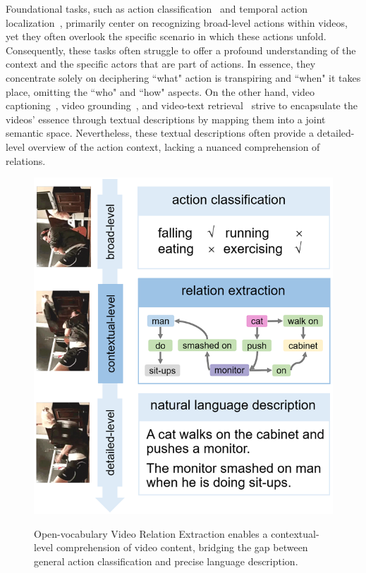 \documentclass[letterpaper]{article}
\begin{document}
Foundational tasks, such as action classification~\cite{kong2022human} and temporal action localization~\cite{9062498}, primarily center on recognizing broad-level actions within videos, yet they often overlook the specific scenario in which these actions unfold. Consequently, these tasks often struggle to offer a profound understanding of the context and the specific actors that are part of actions. In essence, they concentrate solely on deciphering ``what" action is transpiring and ``when" it takes place, omitting the ``who" and ``how" aspects.
On the other hand, video captioning~\cite{chen2019deep}, video grounding~\cite{chen2019semantic, wang2021visual}, and video-text retrieval~\cite{song2023relation} strive to encapsulate the videos' essence through textual descriptions by mapping them into a joint semantic space. Nevertheless, these textual descriptions often provide a detailed-level overview of the action context, lacking a nuanced comprehension of relations.






\begin{figure}[t]
  \centering
  \resizebox{0.7\linewidth}{!}
  {\includegraphics{fig/broad2detail1.png}}
  \caption{Open-vocabulary  Video Relation Extraction enables a contextual-level comprehension of video content, bridging the gap between general action classification and precise language description.}
  \label{fig:motivation}
\end{figure}
\end{document}
